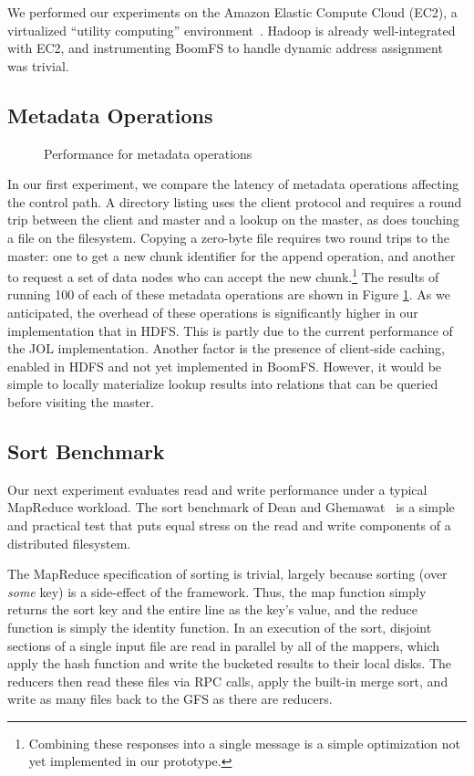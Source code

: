 \documentclass[twocolumn]{article}
\begin{document}
We performed our experiments on the Amazon Elastic Compute Cloud
(EC2), a virtualized ``utility computing''
environment~\cite{amazon-ec2}. Hadoop is already well-integrated with
EC2, and instrumenting BoomFS to handle dynamic address assignment was
trivial.

\subsection{Metadata Operations}
\begin{figure}
\centering
{}
\caption{Performance for metadata operations}
\label{fig:metadata-perf}
\end{figure}

In our first experiment, we compare the latency of metadata operations
affecting the control path.  A directory listing uses the client
protocol and requires a round trip between the client and master and a
lookup on the master, as does touching a file on the filesystem.
Copying a zero-byte file requires two round trips to the master: one
to get a new chunk identifier for the append operation, and another to
request a set of data nodes who can accept the new
chunk.\footnote{Combining these responses into a single message is a
  simple optimization not yet implemented in our prototype.}  The
results of running 100 of each of these metadata operations are shown
in Figure \ref{fig:metadata-perf}.  As we anticipated, the overhead of
these operations is significantly higher in our implementation that in
HDFS.  This is partly due to the current performance of the JOL
implementation. Another factor is the presence of client-side caching,
enabled in HDFS and not yet implemented in BoomFS. However, it would
be simple to locally materialize lookup results into relations that
can be queried before visiting the master.

\subsection{Sort Benchmark}
Our next experiment evaluates read and write performance under a
typical MapReduce workload.  The sort benchmark of Dean and
Ghemawat~\cite{mapreduce} is a simple and practical test that puts
equal stress on the read and write components of a distributed
filesystem.

The MapReduce specification of sorting is trivial, largely because
sorting (over \emph{some} key) is a side-effect of the framework.
Thus, the map function simply returns the sort key and the entire line
as the key's value, and the reduce function is simply the identity
function.  In an execution of the sort, disjoint sections of a single
input file are read in parallel by all of the mappers, which apply the
hash function and write the bucketed results to their local disks.
The reducers then read these files via RPC calls, apply the built-in
merge sort, and write as many files back to the GFS as there are
reducers.
\end{document}
